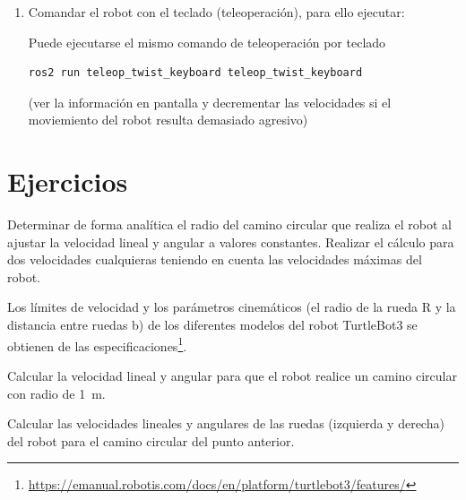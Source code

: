 \documentclass[tp]{lcc}
\begin{document}
\begin{enumerate}
	\begin{enumerate}
	\item En una nueva terminal o pestaña, ejecutar el comando:

\begin{lstlisting}[style=bash] 
ros2 topic pub --rate 1 /cmd_vel geometry_msgs/msg/Twist "{linear: {x: 0.2, y: 0.0, z: 0.0}, angular: {x: 0.0, y: 0.0, z: 0.2}}"
\end{lstlisting}

	\item Detener el robot fijando la velocidad lineal y angular a cero.
	\end{enumerate}

\item Comandar el robot con el teclado (teleoperación), para ello ejecutar:

Puede ejecutarse el mismo comando de teleoperación por teclado
\begin{lstlisting}[style=bash] 
ros2 run teleop_twist_keyboard teleop_twist_keyboard
\end{lstlisting}
(ver la información en pantalla y decrementar las velocidades si el moviemiento del robot
resulta demasiado agresivo)
\end{enumerate}


\section{Ejercicios}

\ejercicio  Determinar de forma analítica el radio del camino circular que realiza el robot al ajustar la velocidad lineal y angular a valores constantes. Realizar el cálculo para dos velocidades cualquieras teniendo en cuenta las velocidades máximas del robot.

\begin{nota}
	Los límites de velocidad y los parámetros cinemáticos (el radio de la rueda R y la distancia entre ruedas b) de los diferentes modelos del robot TurtleBot3 se obtienen de las especificaciones\footnote{\url{https://emanual.robotis.com/docs/en/platform/turtlebot3/features/}}.
\end{nota}

\ejercicio  Calcular la velocidad lineal y angular para que el robot realice un camino circular con radio de \SI{1}{\meter}.

\ejercicio  Calcular las velocidades lineales y angulares de las ruedas (izquierda y derecha) del robot para el camino circular del punto anterior.
\end{document}
